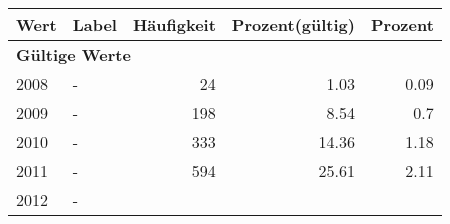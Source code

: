      \begin{longtable}{lXrrr}
     \toprule
     \textbf{Wert} & \textbf{Label} & \textbf{Häufigkeit} & \textbf{Prozent(gültig)} & \textbf{Prozent} \\
     \endhead
     \midrule
     \multicolumn{5}{l}{\textbf{Gültige Werte}}\\

     2008 &
     \multicolumn{1}{X}{ -  } &


       \num{24} &
       \num[round-mode=places,round-precision=2]{1,03} &
         \num[round-mode=places,round-precision=2]{0,09} \\

     2009 &
     \multicolumn{1}{X}{ -  } &


       \num{198} &
       \num[round-mode=places,round-precision=2]{8,54} &
         \num[round-mode=places,round-precision=2]{0,7} \\

     2010 &
     \multicolumn{1}{X}{ -  } &


       \num{333} &
       \num[round-mode=places,round-precision=2]{14,36} &
         \num[round-mode=places,round-precision=2]{1,18} \\

     2011 &
     \multicolumn{1}{X}{ -  } &


       \num{594} &
       \num[round-mode=places,round-precision=2]{25,61} &
         \num[round-mode=places,round-precision=2]{2,11} \\

     2012 &
     \multicolumn{1}{X}{ -  } &



\end{longtable}
